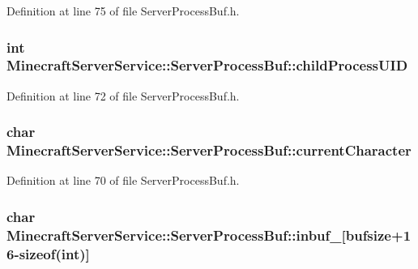 Definition at line 75 of file Server\+Process\+Buf.\+h.

\subsubsection[{\texorpdfstring{child\+Process\+U\+ID}{childProcessUID}}]{\setlength{\rightskip}{0pt plus 5cm}int Minecraft\+Server\+Service\+::\+Server\+Process\+Buf\+::child\+Process\+U\+ID\hspace{0.3cm}{\ttfamily [private]}}\hypertarget{class_minecraft_server_service_1_1_server_process_buf_a383807da0dc587fe425f271f045f041e}{}\label{class_minecraft_server_service_1_1_server_process_buf_a383807da0dc587fe425f271f045f041e}


Definition at line 72 of file Server\+Process\+Buf.\+h.

\subsubsection[{\texorpdfstring{current\+Character}{currentCharacter}}]{\setlength{\rightskip}{0pt plus 5cm}char Minecraft\+Server\+Service\+::\+Server\+Process\+Buf\+::current\+Character\hspace{0.3cm}{\ttfamily [private]}}\hypertarget{class_minecraft_server_service_1_1_server_process_buf_a0b8d691409b4ea56fa1e1e7bea4ffaed}{}\label{class_minecraft_server_service_1_1_server_process_buf_a0b8d691409b4ea56fa1e1e7bea4ffaed}


Definition at line 70 of file Server\+Process\+Buf.\+h.

\subsubsection[{\texorpdfstring{inbuf\+\_\+}{inbuf_}}]{\setlength{\rightskip}{0pt plus 5cm}char Minecraft\+Server\+Service\+::\+Server\+Process\+Buf\+::inbuf\+\_\+\mbox{[}{\bf bufsize}+16-\/sizeof(int)\mbox{]}\hspace{0.3cm}{\ttfamily [private]}}\hypertarget{class_minecraft_server_service_1_1_server_process_buf_a7be8394c7d17d452ee61d87e8c807256}{}\label{class_minecraft_server_service_1_1_server_process_buf_a7be8394c7d17d452ee61d87e8c807256}



